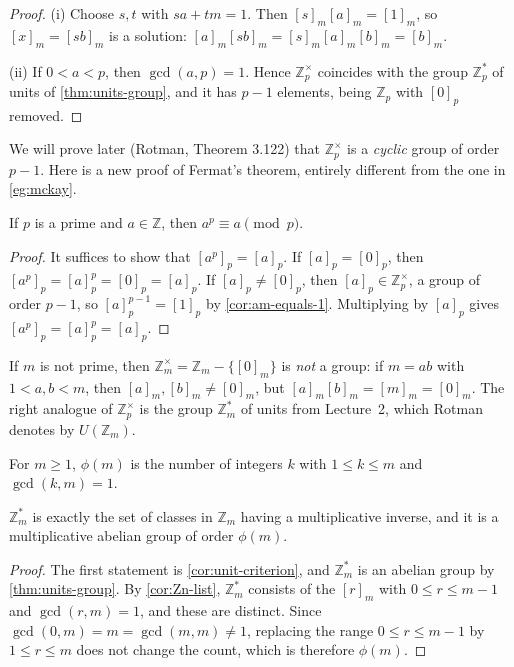 \begin{proof}
	(i) Choose \(s, t\) with \(sa + tm = 1\). Then \([s]_m[a]_m = [1]_m\), so
	\([x]_m = [sb]_m\) is a solution: \([a]_m[sb]_m = [s]_m[a]_m[b]_m = [b]_m\).

	(ii) If \(0 < a < p\), then \(\gcd(a, p) = 1\). Hence \(\mathbb Z_p^\times\) coincides
	with the group \(\mathbb Z_p^*\) of units of \autoref{thm:units-group}, and it has
	\(p - 1\) elements, being \(\mathbb Z_p\) with \([0]_p\) removed.
\end{proof}

We will prove later (Rotman, Theorem 3.122) that \(\mathbb Z_p^\times\) is a \emph{cyclic}
group of order \(p - 1\). Here is a new proof of Fermat's theorem, entirely different from
the one in \autoref{eg:mckay}.

\begin{corollary}[Fermat]\label{cor:fermat}
	If \(p\) is a prime and \(a \in \mathbb Z\), then \(a^p \equiv a \pmod p\).
\end{corollary}

\begin{proof}
	It suffices to show that \([a^p]_p = [a]_p\). If \([a]_p = [0]_p\), then
	\([a^p]_p = [a]_p^p = [0]_p = [a]_p\). If \([a]_p \neq [0]_p\), then
	\([a]_p \in \mathbb Z_p^\times\), a group of order \(p - 1\), so
	\([a]_p^{p-1} = [1]_p\) by \autoref{cor:am-equals-1}. Multiplying by \([a]_p\) gives
	\([a^p]_p = [a]_p^p = [a]_p\).
\end{proof}

If \(m\) is not prime, then \(\mathbb Z_m^\times = \mathbb Z_m - \{[0]_m\}\) is \emph{not} a
group: if \(m = ab\) with \(1 < a, b < m\), then \([a]_m, [b]_m \neq [0]_m\), but
\([a]_m[b]_m = [m]_m = [0]_m\). The right analogue of \(\mathbb Z_p^\times\) is the group
\(\mathbb Z_m^*\) of units from Lecture~2, which Rotman denotes by \(U(\mathbb Z_m)\).

\begin{definition}
	For \(m \geq 1\), \(\phi(m)\) is the number of integers \(k\) with \(1 \leq k \leq m\) and
	\(\gcd(k, m) = 1\).
\end{definition}

\begin{lemma}\label{lem:units-order}
	\(\mathbb Z_m^*\) is exactly the set of classes in \(\mathbb Z_m\) having a
	multiplicative inverse, and it is a multiplicative abelian group of order \(\phi(m)\).
\end{lemma}

\begin{proof}
	The first statement is \autoref{cor:unit-criterion}, and \(\mathbb Z_m^*\) is an abelian
	group by \autoref{thm:units-group}. By \autoref{cor:Zn-list}, \(\mathbb Z_m^*\) consists
	of the \([r]_m\) with \(0 \leq r \leq m-1\) and \(\gcd(r, m) = 1\), and these are
	distinct. Since \(\gcd(0, m) = m = \gcd(m, m) \neq 1\), replacing the range
	\(0 \leq r \leq m-1\) by \(1 \leq r \leq m\) does not change the count, which is
	therefore \(\phi(m)\).
\end{proof}

